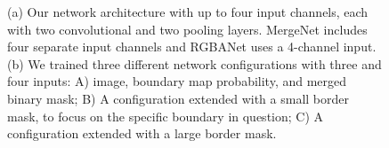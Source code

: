 \begin{figure}[t]
 \centering

	\caption{(a) Our network architecture with up to four input channels, each with two convolutional and two pooling layers. MergeNet includes four separate input channels and RGBANet uses a 4-channel input. (b) We trained three different network configurations with three and four inputs: A) image, boundary map probability, and merged binary mask; B) A configuration extended with a small border mask, to focus on the specific boundary in question; C) A configuration extended with a large border mask.}

\end{figure}

